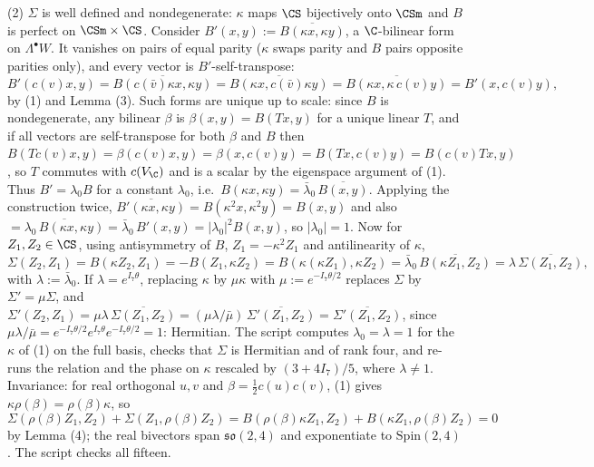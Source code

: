 (2) $\Sigma$ is well defined and nondegenerate: $\kappa$ maps $\CS$ bijectively onto $\CSm$ and $B$ is perfect on $\CSm\times\CS$. Consider $B'(x, y) := \overline{B(\kappa x, \kappa y)}$, a $\C$-bilinear form on $\Lambda^\bullet W$. It vanishes on pairs of equal parity ($\kappa$ swaps parity and $B$ pairs opposite parities only), and every vector is $B'$-self-transpose:
\[
B'(c(v)x, y) = \overline{B(c(\bar v)\kappa x, \kappa y)} = \overline{B(\kappa x, c(\bar v)\kappa y)} = \overline{B(\kappa x, \kappa\, c(v) y)} = B'(x, c(v) y),
\]
by (1) and Lemma (3). Such forms are unique up to scale: since $B$ is nondegenerate, any bilinear $\beta$ is $\beta(x,y) = B(Tx, y)$ for a unique linear $T$, and if all vectors are self-transpose for both $\beta$ and $B$ then $B(Tc(v)x, y) = \beta(c(v)x, y) = \beta(x, c(v)y) = B(Tx, c(v)y) = B(c(v)Tx, y)$, so $T$ commutes with $c(V_\C)$ and is a scalar by the eigenspace argument of (1). Thus $B' = \lambda_0 B$ for a constant $\lambda_0$, i.e.\ $B(\kappa x, \kappa y) = \bar\lambda_0\,\overline{B(x,y)}$. Applying the construction twice, $\overline{B'(\kappa x, \kappa y)} = B(\kappa^2 x, \kappa^2 y) = B(x, y)$ and also $= \overline{\lambda_0\,B(\kappa x, \kappa y)} = \bar\lambda_0\, B'(x,y) = |\lambda_0|^2 B(x,y)$, so $|\lambda_0| = 1$. Now for $Z_1, Z_2 \in \CS$, using antisymmetry of $B$, $Z_1 = -\kappa^2 Z_1$ and antilinearity of $\kappa$,
\[
\Sigma(Z_2, Z_1) = B(\kappa Z_2, Z_1) = -B(Z_1, \kappa Z_2) = B(\kappa(\kappa Z_1), \kappa Z_2) = \bar\lambda_0\,\overline{B(\kappa Z_1, Z_2)} = \lambda\,\overline{\Sigma(Z_1, Z_2)},
\]
with $\lambda := \bar\lambda_0$.
If $\lambda = e^{I_7\theta}$, replacing $\kappa$ by $\mu\kappa$ with $\mu := e^{-I_7\theta/2}$ replaces $\Sigma$ by $\Sigma' = \mu\Sigma$, and $\Sigma'(Z_2,Z_1) = \mu\lambda\,\overline{\Sigma(Z_1,Z_2)} = (\mu\lambda/\bar\mu)\,\overline{\Sigma'(Z_1,Z_2)} = \overline{\Sigma'(Z_1,Z_2)}$, since $\mu\lambda/\bar\mu = e^{-I_7\theta/2}e^{I_7\theta}e^{-I_7\theta/2} = 1$: Hermitian. The script computes $\lambda_0 = \lambda = 1$ for the $\kappa$ of (1) on the full basis, checks that $\Sigma$ is Hermitian and of rank four, and re-runs the relation and the phase on $\kappa$ rescaled by $(3+4I_7)/5$, where $\lambda \neq 1$. Invariance: for real orthogonal $u, v$ and $\beta = \tfrac12 c(u)c(v)$, (1) gives $\kappa\rho(\beta) = \rho(\beta)\kappa$, so
\[
\Sigma(\rho(\beta)Z_1, Z_2) + \Sigma(Z_1, \rho(\beta)Z_2) = B(\rho(\beta)\kappa Z_1, Z_2) + B(\kappa Z_1, \rho(\beta) Z_2) = 0
\]
by Lemma (4); the real bivectors span $\mathfrak{so}(2,4)$ and exponentiate to $\mathrm{Spin}(2,4)$. The script checks all fifteen.

